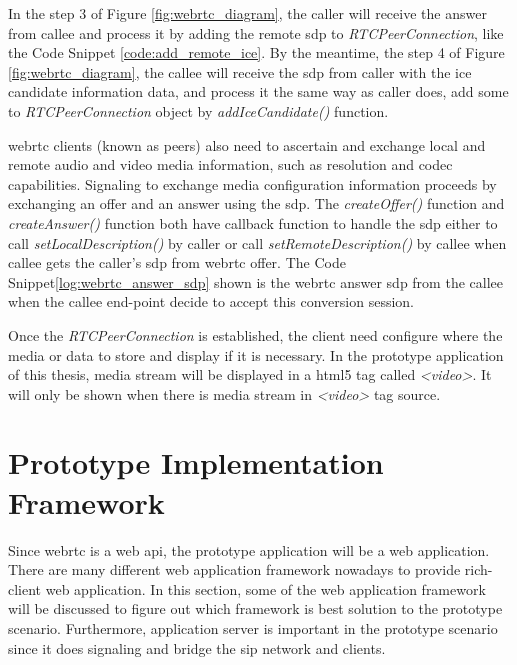 \par In the step 3 of Figure \ref{fig:webrtc_diagram}, the caller will receive the answer from callee and process it by adding the remote \gls{sdp} to \textit{RTCPeerConnection}, like the Code Snippet \ref{code:add_remote_ice}. By the meantime, the step 4 of Figure \ref{fig:webrtc_diagram}, the callee will receive the \gls{sdp} from caller with the \gls{ice} candidate information data, and process it the same way as caller does, add some to \textit{RTCPeerConnection} object by \textit{addIceCandidate()} function.

\par \gls{webrtc} clients (known as peers) also need to ascertain and exchange local and remote audio and video media information, such as resolution and codec capabilities. Signaling to exchange media configuration information proceeds by exchanging an offer and an answer using the \gls{sdp}. The \textit{createOffer()} function and \textit{createAnswer()} function both have callback function to handle the \gls{sdp} either to call \textit{setLocalDescription()} by caller or call \textit{setRemoteDescription()} by callee when callee gets the caller's \gls{sdp} from \gls{webrtc} offer. The Code Snippet\ref{log:webrtc_answer_sdp} shown is the \gls{webrtc} answer \gls{sdp} from the callee when the callee end-point decide to accept this conversion session.

\par Once the \textit{RTCPeerConnection} is established, the client need configure where the media or data to store and display if it is necessary. In the prototype application of this thesis, media stream will be displayed in a \gls{html5} tag called \textit{<video>}. It will only be shown when there is media stream in \textit{<video>} tag source.

\section{Prototype Implementation Framework}

\noindent Since \gls{webrtc} is a web \gls{api}, the prototype application will be a web application. There are many different web application framework nowadays to provide rich-client web application. In this section, some of the web application framework will be discussed to figure out which framework is best solution to the prototype scenario. Furthermore, application server is important in the prototype scenario since it does  signaling and bridge the \gls{sip} network and clients.

